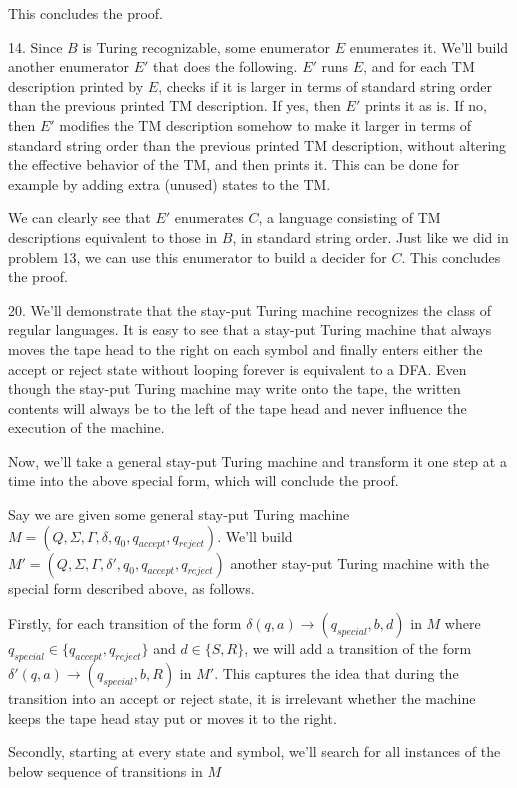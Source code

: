 \documentclass{article}
\begin{document}
This concludes the proof.

14. Since $B$ is Turing recognizable, some enumerator $E$ enumerates it. We'll build another enumerator $E'$ that does the following. $E'$ runs $E$, and for each TM description printed by $E$, checks if it is larger in terms of standard string order than the previous printed TM description. If yes, then $E'$ prints it as is. If no, then $E'$ modifies the TM description somehow to make it larger in terms of standard string order than the previous printed TM description, without altering the effective behavior of the TM, and then prints it. This can be done for example by adding extra (unused) states to the TM.

We can clearly see that $E'$ enumerates $C$, a language consisting of TM descriptions equivalent to those in $B$, in standard string order. Just like we did in problem 13, we can use this enumerator to build a decider for $C$. This concludes the proof.

20. We'll demonstrate that the stay-put Turing machine recognizes the class of regular languages. It is easy to see that a stay-put Turing machine that always moves the tape head to the right on each symbol and finally enters either the accept or reject state without looping forever is equivalent to a DFA. Even though the stay-put Turing machine may write onto the tape, the written contents will always be to the left of the tape head and never influence the execution of the machine.

Now, we'll take a general stay-put Turing machine and transform it one step at a time into the above special form, which will conclude the proof.

Say we are given some general stay-put Turing machine $M = (Q, \Sigma, \Gamma, \delta, q_0, q_{accept}, q_{reject})$. We'll build $M' = (Q, \Sigma, \Gamma, \delta', q_0, q_{accept}, q_{reject})$ another stay-put Turing machine with the special form described above, as follows.

Firstly, for each transition of the form $\delta(q, a) \rightarrow (q_{special}, b, d)$ in $M$ where $q_{special} \in \{q_{accept}, q_{reject}\}$ and $d \in \{S, R\}$, we will add a transition of the form $\delta'(q, a) \rightarrow (q_{special}, b, R)$ in $M'$. This captures the idea that during the transition into an accept or reject state, it is irrelevant whether the machine keeps the tape head stay put or moves it to the right.

Secondly, starting at every state and symbol, we'll search for all instances of the below sequence of transitions in $M$
\end{document}
